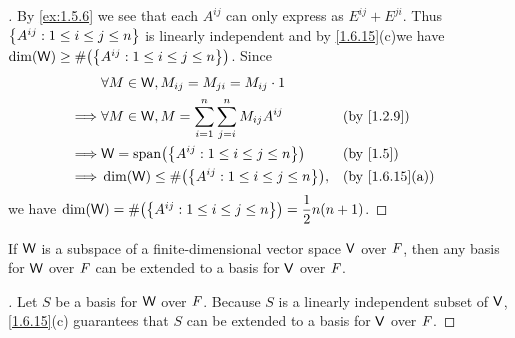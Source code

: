 \begin{proof}[]
  By \cref{ex:1.5.6} we see that each \(A^{i j}\) can only express as \(E^{i j} + E^{j i}\).
  Thus \(\left\lbrace A^{i j} : 1 \leq i \leq j \leq n\right\rbrace\) is linearly independent and by \cref{1.6.15}(c)we have  \(\dim(\W) \geq \#\pa{\set{A^{i j} : 1 \leq i \leq j \leq n}}\).
  Since
  \begin{align*}
             & \forall M \in \W, M_{i j} = M_{j i} = M_{i j} \cdot 1                                   \\
    \implies & \forall M \in \W, M = \sum_{i = 1}^n \sum_{j = i}^n M_{i j} A^{i j} &  & \by{1.2.9}     \\
    \implies & \W = \spn{\set{A^{i j} : 1 \leq i \leq j \leq n}}                   &  & \by{1.5}       \\
    \implies & \dim(\W) \leq \#\pa{\set{A^{i j} : 1 \leq i \leq j \leq n}},        &  & \by{1.6.15}[a]
  \end{align*}
  we have \(\dim(\W) = \#\pa{\set{A^{i j} : 1 \leq i \leq j \leq n}} = \dfrac{1}{2} n(n + 1)\).
\end{proof}

\begin{cor}\label{1.6.19}
  If \(\mathsf{W}\) is a subspace of a finite-dimensional vector space \(\mathsf{V}\) over \(\mathit{F}\), then any basis for \(\mathsf{W}\) over \(\mathit{F}\) can be extended to a basis for \(\mathsf{V}\) over \(\mathit{F}\).
\end{cor}

\begin{proof}[]
  Let \(S\) be a basis for \(\mathsf{W}\) over \(\mathit{F}\).
  Because \(S\) is a linearly independent subset of \(\mathsf{V}\), \cref{1.6.15}(c) guarantees that \(S\) can be extended to a basis for \(\mathsf{V}\) over \(\mathit{F}\).
\end{proof}

